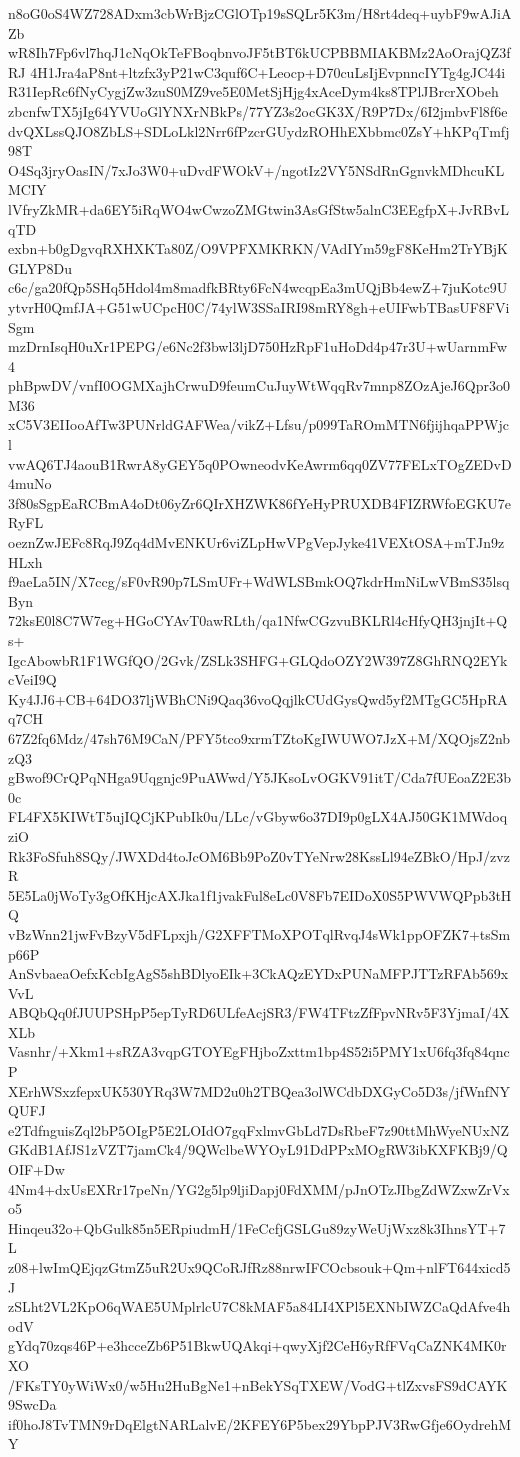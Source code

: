 n8oG0oS4WZ728ADxm3cbWrBjzCGlOTp19sSQLr5K3m/H8rt4deq+uybF9wAJiAZb
wR8Ih7Fp6vl7hqJ1cNqOkTeFBoqbnvoJF5tBT6kUCPBBMIAKBMz2AoOrajQZ3fRJ
4H1Jra4aP8nt+ltzfx3yP21wC3quf6C+Leocp+D70cuLsIjEvpnncIYTg4gJC44i
R31IepRc6fNyCygjZw3zuS0MZ9ve5E0MetSjHjg4xAceDym4ks8TPlJBrcrXObeh
zbcnfwTX5jIg64YVUoGlYNXrNBkPs/77YZ3s2ocGK3X/R9P7Dx/6I2jmbvFl8f6e
dvQXLssQJO8ZbLS+SDLoLkl2Nrr6fPzcrGUydzROHhEXbbmc0ZsY+hKPqTmfj98T
O4Sq3jryOasIN/7xJo3W0+uDvdFWOkV+/ngotIz2VY5NSdRnGgnvkMDhcuKLMCIY
lVfryZkMR+da6EY5iRqWO4wCwzoZMGtwin3AsGfStw5alnC3EEgfpX+JvRBvLqTD
exbn+b0gDgvqRXHXKTa80Z/O9VPFXMKRKN/VAdIYm59gF8KeHm2TrYBjKGLYP8Du
c6c/ga20fQp5SHq5Hdol4m8madfkBRty6FcN4wcqpEa3mUQjBb4ewZ+7juKotc9U
ytvrH0QmfJA+G51wUCpcH0C/74ylW3SSaIRI98mRY8gh+eUIFwbTBasUF8FViSgm
mzDrnIsqH0uXr1PEPG/e6Nc2f3bwl3ljD750HzRpF1uHoDd4p47r3U+wUarnmFw4
phBpwDV/vnfI0OGMXajhCrwuD9feumCuJuyWtWqqRv7mnp8ZOzAjeJ6Qpr3o0M36
xC5V3EIIooAfTw3PUNrldGAFWea/vikZ+Lfsu/p099TaROmMTN6fjijhqaPPWjcl
vwAQ6TJ4aouB1RwrA8yGEY5q0POwneodvKeAwrm6qq0ZV77FELxTOgZEDvD4muNo
3f80sSgpEaRCBmA4oDt06yZr6QIrXHZWK86fYeHyPRUXDB4FIZRWfoEGKU7eRyFL
oeznZwJEFc8RqJ9Zq4dMvENKUr6viZLpHwVPgVepJyke41VEXtOSA+mTJn9zHLxh
f9aeLa5IN/X7ccg/sF0vR90p7LSmUFr+WdWLSBmkOQ7kdrHmNiLwVBmS35lsqByn
72ksE0l8C7W7eg+HGoCYAvT0awRLth/qa1NfwCGzvuBKLRl4cHfyQH3jnjIt+Qs+
IgcAbowbR1F1WGfQO/2Gvk/ZSLk3SHFG+GLQdoOZY2W397Z8GhRNQ2EYkcVeiI9Q
Ky4JJ6+CB+64DO37ljWBhCNi9Qaq36voQqjlkCUdGysQwd5yf2MTgGC5HpRAq7CH
67Z2fq6Mdz/47sh76M9CaN/PFY5tco9xrmTZtoKgIWUWO7JzX+M/XQOjsZ2nbzQ3
gBwof9CrQPqNHga9Uqgnjc9PuAWwd/Y5JKsoLvOGKV91itT/Cda7fUEoaZ2E3b0c
FL4FX5KIWtT5ujIQCjKPubIk0u/LLc/vGbyw6o37DI9p0gLX4AJ50GK1MWdoqziO
Rk3FoSfuh8SQy/JWXDd4toJcOM6Bb9PoZ0vTYeNrw28KssLl94eZBkO/HpJ/zvzR
5E5La0jWoTy3gOfKHjcAXJka1f1jvakFul8eLc0V8Fb7EIDoX0S5PWVWQPpb3tHQ
vBzWnn21jwFvBzyV5dFLpxjh/G2XFFTMoXPOTqlRvqJ4sWk1ppOFZK7+tsSmp66P
AnSvbaeaOefxKcbIgAgS5shBDlyoEIk+3CkAQzEYDxPUNaMFPJTTzRFAb569xVvL
ABQbQq0fJUUPSHpP5epTyRD6ULfeAcjSR3/FW4TFtzZfFpvNRv5F3YjmaI/4XXLb
Vasnhr/+Xkm1+sRZA3vqpGTOYEgFHjboZxttm1bp4S52i5PMY1xU6fq3fq84qncP
XErhWSxzfepxUK530YRq3W7MD2u0h2TBQea3olWCdbDXGyCo5D3s/jfWnfNYQUFJ
e2TdfnguisZql2bP5OIgP5E2LOIdO7gqFxlmvGbLd7DsRbeF7z90ttMhWyeNUxNZ
GKdB1AfJS1zVZT7jamCk4/9QWclbeWYOyL91DdPPxMOgRW3ibKXFKBj9/QOIF+Dw
4Nm4+dxUsEXRr17peNn/YG2g5lp9ljiDapj0FdXMM/pJnOTzJIbgZdWZxwZrVxo5
Hinqeu32o+QbGulk85n5ERpiudmH/1FeCcfjGSLGu89zyWeUjWxz8k3IhnsYT+7L
z08+lwImQEjqzGtmZ5uR2Ux9QCoRJfRz88nrwIFCOcbsouk+Qm+nlFT644xicd5J
zSLht2VL2KpO6qWAE5UMplrlcU7C8kMAF5a84LI4XPl5EXNbIWZCaQdAfve4hodV
gYdq70zqs46P+e3hcceZb6P51BkwUQAkqi+qwyXjf2CeH6yRfFVqCaZNK4MK0rXO
/FKsTY0yWiWx0/w5Hu2HuBgNe1+nBekYSqTXEW/VodG+tlZxvsFS9dCAYK9SwcDa
if0hoJ8TvTMN9rDqElgtNARLalvE/2KFEY6P5bex29YbpPJV3RwGfje6OydrehMY
